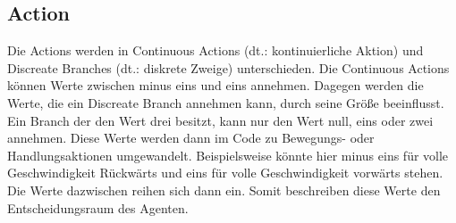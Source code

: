\subsection{Action}
\label{action}
Die Actions werden in Continuous Actions (dt.: kontinuierliche Aktion) und Discreate Branches (dt.: diskrete Zweige) unterschieden. Die Continuous Actions können Werte zwischen minus eins und eins annehmen. Dagegen werden die Werte, die ein Discreate Branch annehmen kann, durch seine Größe beeinflusst. Ein Branch der den Wert drei besitzt, kann nur den Wert null, eins oder zwei annehmen. Diese Werte werden dann im Code zu Bewegungs- oder Handlungsaktionen umgewandelt. Beispielsweise könnte hier minus eins für volle Geschwindigkeit Rückwärts und eins für volle Geschwindigkeit vorwärts stehen. Die Werte dazwischen reihen sich dann ein. Somit beschreiben diese Werte den Entscheidungsraum des Agenten. 

